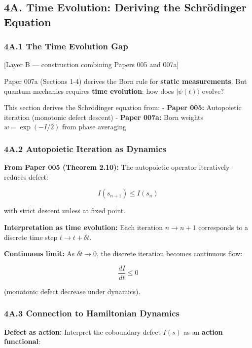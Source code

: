 \documentclass[
]{article}
\begin{document}
\subsection{4A. Time Evolution: Deriving the Schrödinger
Equation}\label{a.-time-evolution-deriving-the-schruxf6dinger-equation}

\subsubsection{4A.1 The Time Evolution
Gap}\label{a.1-the-time-evolution-gap}

{[}Layer B --- construction combining Papers 005 and 007a{]}

Paper 007a (Sections 1-4) derives the Born rule for \textbf{static
measurements}. But quantum mechanics requires \textbf{time evolution}:
how does \(|\psi(t)\rangle\) evolve?

This section derives the Schrödinger equation from: - \textbf{Paper
005:} Autopoietic iteration (monotonic defect descent) - \textbf{Paper
007a:} Born weights \(w = \exp(-I/2)\) from phase averaging

\subsubsection{4A.2 Autopoietic Iteration as
Dynamics}\label{a.2-autopoietic-iteration-as-dynamics}

\textbf{From Paper 005 (Theorem 2.10):} The autopoietic operator
iteratively reduces defect:

\[I(s_{n+1}) \leq I(s_n)\]

with strict descent unless at fixed point.

\textbf{Interpretation as time evolution:} Each iteration \(n \to n+1\)
corresponds to a discrete time step \(t \to t + \delta t\).

\textbf{Continuous limit:} As \(\delta t \to 0\), the discrete iteration
becomes continuous flow:

\[\frac{dI}{dt} \leq 0\]

(monotonic defect decrease under dynamics).

\subsubsection{4A.3 Connection to Hamiltonian
Dynamics}\label{a.3-connection-to-hamiltonian-dynamics}

\textbf{Defect as action:} Interpret the coboundary defect \(I(s)\) as
an \textbf{action functional}:
\end{document}
